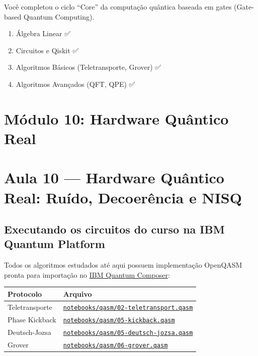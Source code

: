 \documentclass[
  brazilian,
]{report}
\newcounter{none} %
\providecommand{\tightlist}{%
  \setlength{\itemsep}{0pt}\setlength{\parskip}{0pt}}
\begin{document}
Você completou o ciclo ``Core'' da computação quântica baseada em gates
(Gate-based Quantum Computing).

\begin{enumerate}
\def\labelenumi{\arabic{enumi}.}
\tightlist
\item
  Álgebra Linear ✅
\item
  Circuitos e Qiskit ✅
\item
  Algoritmos Básicos (Teletransporte, Grover) ✅
\item
  Algoritmos Avançados (QFT, QPE) ✅
\end{enumerate}

\newpage

\chapter{Módulo 10: Hardware Quântico
Real}\label{muxf3dulo-10-hardware-quuxe2ntico-real}

\chapter{Aula 10 --- Hardware Quântico Real: Ruído, Decoerência e
NISQ}\label{aula-10-hardware-quuxe2ntico-real-ruuxeddo-decoeruxeancia-e-nisq}

\section{Executando os circuitos do curso na IBM Quantum
Platform}\label{executando-os-circuitos-do-curso-na-ibm-quantum-platform}

Todos os algoritmos estudados até aqui possuem implementação OpenQASM
pronta para importação no \href{https://quantum.ibm.com/composer}{IBM
Quantum Composer}:

{\def\LTcaptype{none} %
\begin{longtable}[]{@{}
  >{\raggedright\arraybackslash}p{}
  >{\raggedright\arraybackslash}p{}@{}}
\toprule\noalign{}
\begin{minipage}[b]{\linewidth}\raggedright
Protocolo
\end{minipage} & \begin{minipage}[b]{\linewidth}\raggedright
Arquivo
\end{minipage} \\
\midrule\noalign{}
\endhead
\bottomrule\noalign{}
\endlastfoot
Teletransporte &
\href{./notebooks/qasm/02-teletransport.qasm}{\texttt{notebooks/qasm/02-teletransport.qasm}} \\
Phase Kickback &
\href{./notebooks/qasm/05-kickback.qasm}{\texttt{notebooks/qasm/05-kickback.qasm}} \\
Deutsch-Jozsa &
\href{./notebooks/qasm/05-deutsch-jozsa.qasm}{\texttt{notebooks/qasm/05-deutsch-jozsa.qasm}} \\
Grover &
\href{./notebooks/qasm/06-grover.qasm}{\texttt{notebooks/qasm/06-grover.qasm}} \\
\end{longtable}
}
\end{document}
